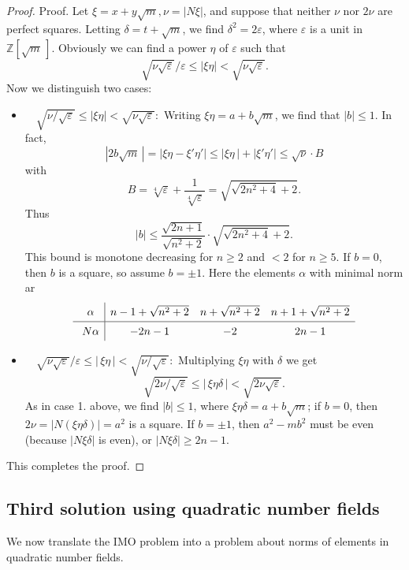 \documentclass{amsart}
\newcommand{\rsp}{\raisebox{0em}[2.7ex][1.3ex]{\rule{0em}{2ex} }}
\newcommand{\Z}{{\mathbb Z}}
\newcommand{\eps}{\varepsilon}
\begin{document}
\begin{proof}
Proof.  Let $\xi= x+y\sqrt{m}, \nu=|N\xi|$,
and suppose that neither $\nu$ nor $2\nu$ are perfect squares.
Letting $\delta = t + \sqrt{m}$, we find $\delta^2 = 2\eps$,
where $\eps$ is a unit in $\Z[\sqrt{m}\,]$.
Obviously we can find a power $\eta$ of $\eps$ such that
\[\sqrt{\nu \sqrt{\eps}}/\eps \le |\xi\eta|  < \sqrt{\nu\sqrt{\eps}}.\]
Now we distinguish two cases:
\begin{itemize}
\item[1.] $\quad \sqrt{\nu/\sqrt{\eps}} \le |\xi \eta| <  \sqrt{\nu \sqrt{\eps}}:$ 
  Writing $\xi\eta = a+b\sqrt{m}$, we find that $|b| \le 1$. In fact,
  $$ | 2b\sqrt{m}\,| = |\xi\eta  - \xi'\eta'| \le  |\xi\eta\,| + | \xi'\eta'|
                              \le \sqrt{\nu} \cdot B $$  
  with 
  $$ B = \sqrt[4]{\eps} + \frac1{\sqrt[4]{\eps}} = \sqrt{\sqrt{2n^2 + 4} + 2}. $$
 Thus
  $$ |b| \le \frac{\sqrt{2n+1}}{\sqrt{n^2+2}} \cdot \sqrt{\sqrt{2n^2 + 4} + 2}. $$
This bound is monotone decreasing for $n \ge 2$ and $< 2$ for $n \ge 5$.
  If $b=0$, then $b$ is a square, so assume $b=\pm 1$. Here the elements $\alpha$ with minimal norm ar
  $$ \begin{array}{c|ccc}
         \rsp \alpha    & n-1  + \sqrt{n^2+2}   &   n + \sqrt{n^2+2}    & n+1  + \sqrt{n^2+2} \\  \hline
         \rsp N\alpha &  - 2n - 1  &            - 2                &             2n - 1                
      \end{array} $$    
  \item[2.] $\quad \sqrt{\nu\sqrt{\eps}}/\eps   \le |\,\xi \eta\,| < \sqrt{\nu/\sqrt{\eps}}:$ 
   Multiplying $\xi \eta$ with $\delta$ we get
   $$ \sqrt{2\nu/\sqrt{\eps}} \le |\,\xi \eta \delta\,| < \sqrt{2\nu \sqrt{\eps}}. $$
   As in case 1. above, we find $|b| \le 1$, where
   $\xi \eta \delta = a+b\sqrt{m}$; if $b=0$, then
   $2\nu=|N(\xi \eta \delta)|=a^{2}$ is a square. If $b=\pm 1$, then
   $a^{2}-mb^{2}$ must be even (because $|N\xi\delta|$ is even), 
   or $|N\xi\delta| \ge 2n-1$.    
\end{itemize}
This completes the proof.
\end{proof}



\subsection*{Third solution using quadratic number fields}

We now translate the IMO problem into a problem about norms
of elements in quadratic number fields.
\end{document}

